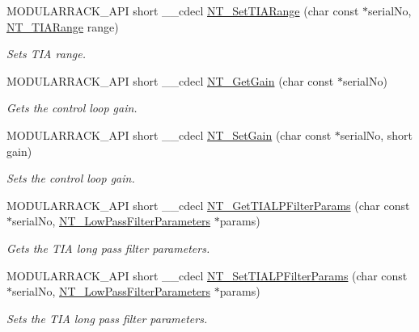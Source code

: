 \begin{DoxyCompactItemize}
M\+O\+D\+U\+L\+A\+R\+R\+A\+C\+K\+\_\+\+A\+PI short \+\_\+\+\_\+cdecl \hyperlink{group___modular_nano_trak_ga5b63b66b68347b8c77300d807e07e340}{N\+T\+\_\+\+Set\+T\+I\+A\+Range} (char const $\ast$serial\+No, \hyperlink{group___common_ga2d700cb6733eb95975d787fb1915a74b}{N\+T\+\_\+\+T\+I\+A\+Range} range)
\begin{DoxyCompactList}\small\item\em Sets T\+IA range. \end{DoxyCompactList}\item 
M\+O\+D\+U\+L\+A\+R\+R\+A\+C\+K\+\_\+\+A\+PI short \+\_\+\+\_\+cdecl \hyperlink{group___modular_nano_trak_ga863a7b770c920e219e9b49f558682c61}{N\+T\+\_\+\+Get\+Gain} (char const $\ast$serial\+No)
\begin{DoxyCompactList}\small\item\em Gets the control loop gain. \end{DoxyCompactList}\item 
M\+O\+D\+U\+L\+A\+R\+R\+A\+C\+K\+\_\+\+A\+PI short \+\_\+\+\_\+cdecl \hyperlink{group___modular_nano_trak_ga2d6560e18d74d6529439fbe423983c3d}{N\+T\+\_\+\+Set\+Gain} (char const $\ast$serial\+No, short gain)
\begin{DoxyCompactList}\small\item\em Sets the control loop gain. \end{DoxyCompactList}\item 
M\+O\+D\+U\+L\+A\+R\+R\+A\+C\+K\+\_\+\+A\+PI short \+\_\+\+\_\+cdecl \hyperlink{group___modular_nano_trak_ga9013db718e8c29017f44ff38d4d8aeda}{N\+T\+\_\+\+Get\+T\+I\+A\+L\+P\+Filter\+Params} (char const $\ast$serial\+No, \hyperlink{struct_n_t___low_pass_filter_parameters}{N\+T\+\_\+\+Low\+Pass\+Filter\+Parameters} $\ast$params)
\begin{DoxyCompactList}\small\item\em Gets the T\+IA long pass filter parameters. \end{DoxyCompactList}\item 
M\+O\+D\+U\+L\+A\+R\+R\+A\+C\+K\+\_\+\+A\+PI short \+\_\+\+\_\+cdecl \hyperlink{group___modular_nano_trak_ga919189a0112727d39abf1b8daaefa656}{N\+T\+\_\+\+Set\+T\+I\+A\+L\+P\+Filter\+Params} (char const $\ast$serial\+No, \hyperlink{struct_n_t___low_pass_filter_parameters}{N\+T\+\_\+\+Low\+Pass\+Filter\+Parameters} $\ast$params)
\begin{DoxyCompactList}\small\item\em Sets the T\+IA long pass filter parameters. \end{DoxyCompactList}\item 

\end{DoxyCompactItemize}
